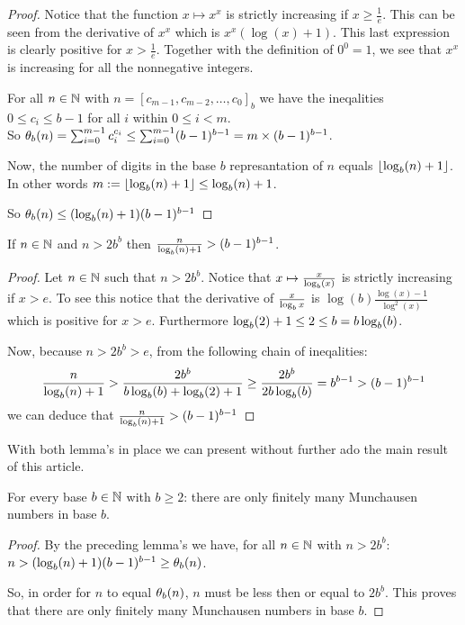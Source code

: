 \begin{proof}
	Notice that the function $x \mapsto x^{x}$ is strictly increasing if 
	$x \ge \frac{1}{e}$. This can be seen from the derivative of $x^{x}$ which 
	is $x^x(\log(x) + 1)$. This last expression is clearly positive for 
	$x > \frac{1}{e}$.
	Together with the definition of $0^{0} = 1$, we see that $x^{x}$ is 
	increasing for all the nonnegative integers.
	
	For all $n \in \N$ with $n = [c_{m-1}, c_{m-2}, \ldots, c_{0}]_{b}$ we have 
	the ineqalities $0 \le c_{i} \le b-1$ for all $i$ within $0 \le i < m$.	\\
	So $\P_{b}(n) = \sum_{i=0}^{m-1} c_{i}^{c_{i}} \le 
	\sum_{i=0}^{m-1} (b-1)^{b-1} = m \times (b-1)^{b-1}$.
	
	Now, the number of digits in the base $b$ represantation of $n$ equals 
	$\floor{\blog(n) + 1}$. In other words $m := \floor{\blog(n) + 1} 
	\le \blog(n) + 1$.
	
	So $\P_{b}(n) \le (\blog(n) + 1)(b-1)^{b-1}$
\end{proof}

\begin{lemma}
	If $n \in \N$ and $n > 2b^{b}$ then $\frac{n}{\blog(n) + 1}	> (b-1)^{b-1}$.
\end{lemma}

\begin{proof}
	Let $n \in \N$ such that $n > 2b^{b}$. Notice that 
	$x \mapsto \frac{x}{\blog(x)}$ is strictly increasing if $x > e$. To see
	this notice that the derivative of $\frac{x}{\blog{x}}$ is 
	$\log(b)\frac{\log(x) - 1}{\log^2(x)}$ which is positive for $x > e$.
	Furthermore $\blog(2) + 1 \le 2 \le b = b\blog(b)$. 
	
	Now, because $n > 2b^{b} > e$, from the following chain of ineqalities:
	\[
		\frac{n}{\blog(n) + 1} > \frac{2b^{b}}{b\blog(b) + \blog(2) + 1} \ge 
		\frac{2b^{b}}{2b\blog(b)} = b^{b-1} > (b-1)^{b-1}
	\]
	we can deduce that $\frac{n}{\blog(n) + 1} > (b-1)^{b-1}$
\end{proof}

With both lemma's in place we can present without further ado the main result of
this article.

\begin{proposition}
	For every base $b \in \N$ with $b \ge 2$: there are only finitely many 
	Munchausen numbers in base $b$.
\end{proposition}

\begin{proof}
	By the preceding lemma's we have, for all $n \in \N$ with $n > 2b^{b}$: 
	$n > (\blog(n) + 1)(b-1)^{b-1} \ge \P_{b}(n)$.
	
	So, in order for $n$ to equal $\P_{b}(n)$, $n$ must be less then or equal to 
	$2b^{b}$. This proves that there are only finitely many Munchausen numbers
	in base $b$.
\end{proof}
